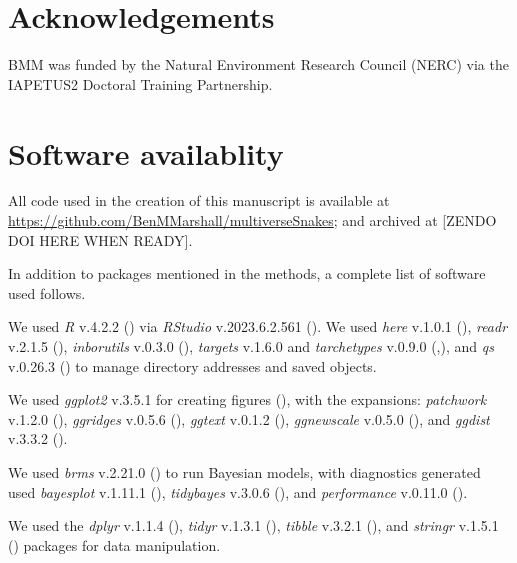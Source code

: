 \documentclass[10pt,a4paper]{article}
\begin{document}
\section{Acknowledgements}\label{acknowledgements}

BMM was funded by the Natural Environment Research Council (NERC) via the IAPETUS2 Doctoral Training Partnership.

\section{Software availablity}\label{software-availablity}

All code used in the creation of this manuscript is available at \url{https://github.com/BenMMarshall/multiverseSnakes}; and archived at {[}ZENDO DOI HERE WHEN READY{]}.

In addition to packages mentioned in the methods, a complete list of software used follows.

We used \emph{R} v.4.2.2 () via \emph{RStudio} v.2023.6.2.561 ().
We used \emph{here} v.1.0.1 (), \emph{readr} v.2.1.5 (), \emph{inborutils} v.0.3.0 (),
\emph{targets} v.1.6.0 and \emph{tarchetypes} v.0.9.0 (,), and \emph{qs} v.0.26.3 () to manage directory addresses and saved objects.

We used \emph{ggplot2} v.3.5.1 for creating figures (), with the expansions: \emph{patchwork} v.1.2.0 (), \emph{ggridges} v.0.5.6 (), \emph{ggtext} v.0.1.2 (), \emph{ggnewscale} v.0.5.0 (), and \emph{ggdist} v.3.3.2 ().

We used \emph{brms} v.2.21.0 () to run Bayesian models, with diagnostics generated used \emph{bayesplot} v.1.11.1 (), \emph{tidybayes} v.3.0.6 (), and \emph{performance} v.0.11.0 ().

We used the \emph{dplyr} v.1.1.4 (), \emph{tidyr} v.1.3.1 (), \emph{tibble} v.3.2.1 (), and \emph{stringr} v.1.5.1 () packages for data manipulation.
\end{document}
